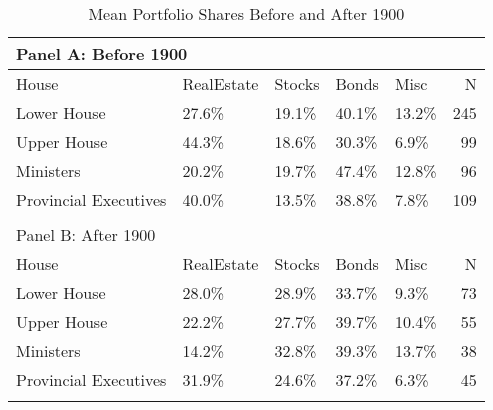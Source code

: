 \begin{table}[ht]
\centering
\begin{tabular}{lllllr}

\multicolumn{6}{l}{Panel A: Before 1900}\\
\hline
House & RealEstate & Stocks & Bonds & Misc & N \\\hline

Lower House & 27.6\% & 19.1\% & 40.1\% & 13.2\% & 245 \\
  Upper House & 44.3\% & 18.6\% & 30.3\% & 6.9\% &  99 \\
  Ministers & 20.2\% & 19.7\% & 47.4\% & 12.8\% &  96 \\
  Provincial Executives & 40.0\% & 13.5\% & 38.8\% & 7.8\% & 109 \\
   \hline\\
\multicolumn{6}{l}{Panel B: After 1900}\\
\hline
House & RealEstate & Stocks & Bonds & Misc & N \\\hline
Lower House & 28.0\% & 28.9\% & 33.7\% & 9.3\% &  73 \\
  Upper House & 22.2\% & 27.7\% & 39.7\% & 10.4\% &  55 \\
  Ministers & 14.2\% & 32.8\% & 39.3\% & 13.7\% &  38 \\
  Provincial Executives & 31.9\% & 24.6\% & 37.2\% & 6.3\% &  45 \\
   \hline
\multicolumn{6}{l}{}\\
\end{tabular}
\caption{Mean Portfolio Shares Before and After 1900}
\label{fig:portcomp1}
\end{table}

